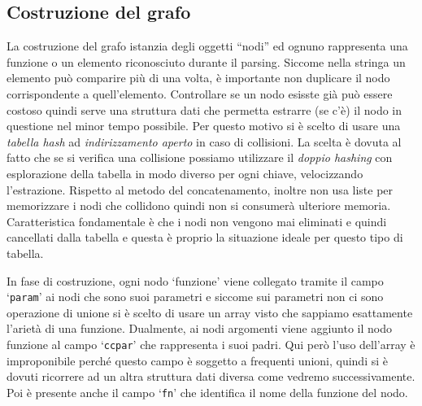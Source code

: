 \documentclass[a4paper,11pt]{article} %
\newcommand{\campo}{\texttt}
\begin{document}
\vspace{-1ex}
\subsection{Costruzione del grafo}
La costruzione del grafo istanzia degli oggetti ``nodi'' ed ognuno rappresenta una funzione
o un elemento riconosciuto durante il parsing. Siccome nella stringa un elemento pu\`o
comparire pi\`u di una volta, \`e importante non duplicare il nodo corrispondente a quell'elemento.
Controllare %
se un nodo %
esisste gi\`a
pu\`o essere costoso quindi
serve una struttura dati che permetta %
estrarre (se c'\`e) il nodo in questione
nel minor tempo possibile. Per questo motivo si \`e scelto di usare una \emph{tabella hash}
ad \emph{indirizzamento aperto} 
in caso di collisioni.
La scelta %
\`e dovuta al fatto che se si verifica una collisione possiamo utilizzare il \emph{doppio hashing}
con esplorazione %
della tabella in modo diverso per ogni chiave, velocizzando
l'estrazione. Rispetto al metodo del concatenamento, inoltre non usa %
liste per memorizzare i nodi che collidono
quindi
non si consumer\`a ulteriore memoria. %
Caratteristica fondamentale \`e che i nodi non vengono mai eliminati e quindi cancellati 
dalla tabella e questa \`e proprio la situazione ideale per questo tipo di tabella.

In fase di costruzione, ogni nodo `funzione' viene collegato tramite il campo `\campo{param}' ai nodi 
che sono suoi parametri e siccome sui parametri non ci sono operazione di unione si \`e 
scelto di usare un array visto che sappiamo esattamente l'ariet\`a di una funzione. 
Dualmente, ai nodi argomenti viene aggiunto il nodo funzione al
campo `\campo{ccpar}' che rappresenta i suoi padri. 
Qui per\`o %
l'uso dell'array
\`e improponibile
perch\'e questo campo %
\`e soggetto a frequenti unioni, quindi si \`e
dovuti ricorrere ad un altra struttura dati diversa %
come vedremo successivamente.
Poi \`e presente anche il campo `\campo{fn}'
che identifica il nome della funzione del nodo. 
\end{document}
